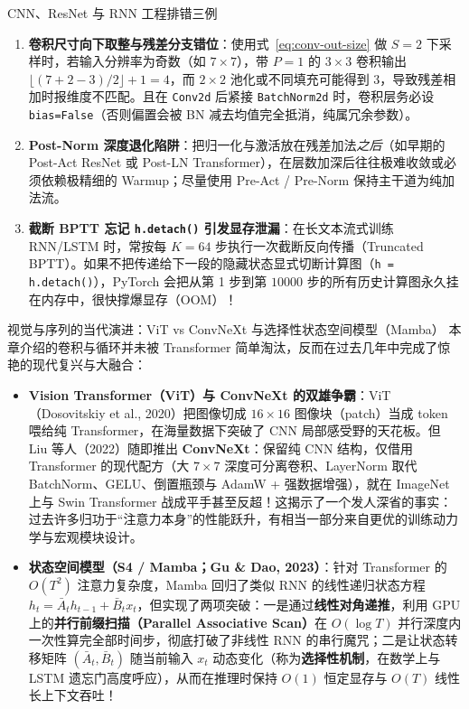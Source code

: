 \begin{failBox}{CNN、ResNet 与 RNN 工程排错三例}
\begin{enumerate}
  \item \textbf{卷积尺寸向下取整与残差分支错位}：使用式~\eqref{eq:conv-out-size} 做 $S=2$ 下采样时，若输入分辨率为奇数（如 $7 \times 7$），带 $P=1$ 的 $3\times 3$ 卷积输出 $\lfloor(7+2-3)/2\rfloor + 1 = 4$，而 $2\times 2$ 池化或不同填充可能得到 $3$，导致残差相加时报维度不匹配。且在 \texttt{Conv2d} 后紧接 \texttt{BatchNorm2d} 时，卷积层务必设 \texttt{bias=False}（否则偏置会被 BN 减去均值完全抵消，纯属冗余参数）。
  \item \textbf{Post-Norm 深度退化陷阱}：把归一化与激活放在残差加法\emph{之后}（如早期的 Post-Act ResNet 或 Post-LN Transformer），在层数加深后往往极难收敛或必须依赖极精细的 Warmup；尽量使用 Pre-Act / Pre-Norm 保持主干道为纯加法流。
  \item \textbf{截断 BPTT 忘记 \texttt{h.detach()} 引发显存泄漏}：在长文本流式训练 RNN/LSTM 时，常按每 $K = 64$ 步执行一次截断反向传播（Truncated BPTT）。如果不把传递给下一段的隐藏状态显式切断计算图（\texttt{h = h.detach()}），PyTorch 会把从第 1 步到第 $10000$ 步的所有历史计算图永久挂在内存中，很快撑爆显存（OOM）！
\end{enumerate}
\end{failBox}

\begin{extBox}{视觉与序列的当代演进：ViT vs ConvNeXt 与选择性状态空间模型（Mamba）}
本章介绍的卷积与循环并未被 Transformer 简单淘汰，反而在过去几年中完成了惊艳的现代复兴与大融合：
\begin{itemize}
  \item \textbf{Vision Transformer（ViT）与 ConvNeXt 的双雄争霸}：ViT（Dosovitskiy et al., 2020）把图像切成 $16\times 16$ 图像块（patch）当成 token 喂给纯 Transformer，在海量数据下突破了 CNN 局部感受野的天花板。但 Liu 等人（2022）随即推出 \textbf{ConvNeXt}：保留纯 CNN 结构，仅借用 Transformer 的现代配方（大 $7\times 7$ 深度可分离卷积、LayerNorm 取代 BatchNorm、GELU、倒置瓶颈与 AdamW + 强数据增强），就在 ImageNet 上与 Swin Transformer 战成平手甚至反超！这揭示了一个发人深省的事实：过去许多归功于“注意力本身”的性能跃升，有相当一部分来自更优的训练动力学与宏观模块设计。
  \item \textbf{状态空间模型（S4 / Mamba；Gu \& Dao, 2023）}：针对 Transformer 的 $O(T^2)$ 注意力复杂度，Mamba 回归了类似 RNN 的线性递归状态方程 $h_t = \bar{A}_t h_{t-1} + \bar{B}_t x_t$，但实现了两项突破：一是通过\textbf{线性对角递推}，利用 GPU 上的\textbf{并行前缀扫描（Parallel Associative Scan）}在 $O(\log T)$ 并行深度内一次性算完全部时间步，彻底打破了非线性 RNN 的串行魔咒；二是让状态转移矩阵 $(\bar{A}_t, \bar{B}_t)$ 随当前输入 $x_t$ 动态变化（称为\textbf{选择性机制}，在数学上与 LSTM 遗忘门高度呼应），从而在推理时保持 $O(1)$ 恒定显存与 $O(T)$ 线性长上下文吞吐！
\end{itemize}
\end{extBox}

